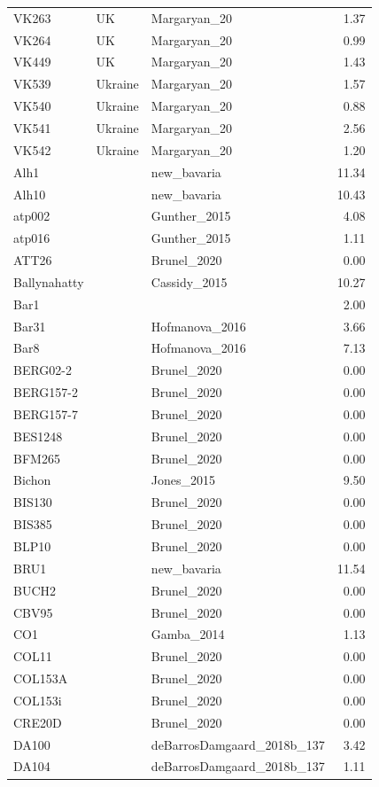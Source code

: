 \begin{longtable}[t]{lllr}
VK263 & UK & Margaryan\_20 & 1.37\\
VK264 & UK & Margaryan\_20 & 0.99\\
VK449 & UK & Margaryan\_20 & 1.43\\
VK539 & Ukraine & Margaryan\_20 & 1.57\\
VK540 & Ukraine & Margaryan\_20 & 0.88\\
VK541 & Ukraine & Margaryan\_20 & 2.56\\
VK542 & Ukraine & Margaryan\_20 & 1.20\\
Alh1 &  & new\_bavaria & 11.34\\
Alh10 &  & new\_bavaria & 10.43\\
atp002 &  & Gunther\_2015 & 4.08\\
atp016 &  & Gunther\_2015 & 1.11\\
ATT26 &  & Brunel\_2020 & 0.00\\
Ballynahatty &  & Cassidy\_2015 & 10.27\\
Bar1 &  &  & 2.00\\
Bar31 &  & Hofmanova\_2016 & 3.66\\
Bar8 &  & Hofmanova\_2016 & 7.13\\
BERG02-2 &  & Brunel\_2020 & 0.00\\
BERG157-2 &  & Brunel\_2020 & 0.00\\
BERG157-7 &  & Brunel\_2020 & 0.00\\
BES1248 &  & Brunel\_2020 & 0.00\\
BFM265 &  & Brunel\_2020 & 0.00\\
Bichon &  & Jones\_2015 & 9.50\\
BIS130 &  & Brunel\_2020 & 0.00\\
BIS385 &  & Brunel\_2020 & 0.00\\
BLP10 &  & Brunel\_2020 & 0.00\\
BRU1 &  & new\_bavaria & 11.54\\
BUCH2 &  & Brunel\_2020 & 0.00\\
CBV95 &  & Brunel\_2020 & 0.00\\
CO1 &  & Gamba\_2014 & 1.13\\
COL11 &  & Brunel\_2020 & 0.00\\
COL153A &  & Brunel\_2020 & 0.00\\
COL153i &  & Brunel\_2020 & 0.00\\
CRE20D &  & Brunel\_2020 & 0.00\\
DA100 &  & deBarrosDamgaard\_2018b\_137 & 3.42\\
DA104 &  & deBarrosDamgaard\_2018b\_137 & 1.11\\

\end{longtable}
